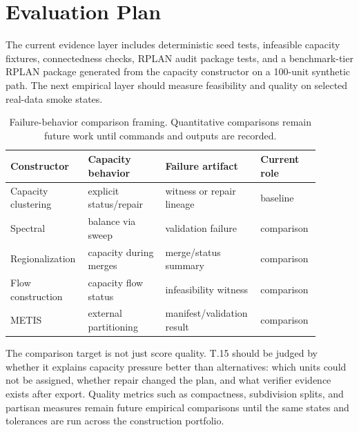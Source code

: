 \section{Evaluation Plan}

The current evidence layer includes deterministic seed tests, infeasible
capacity fixtures, connectedness checks, RPLAN audit package tests, and a
benchmark-tier RPLAN package generated from the capacity constructor on a
100-unit synthetic path. The next empirical layer should measure feasibility
and quality on selected real-data smoke states.

\begin{table}[h]
\centering
\small
{}
\caption{Evidence ladder for T.15 claims. Feasibility and quality are tracked
separately.}
\end{table}

\begin{table}[h]
\centering
\small
\begin{tabular}{p{0.23\linewidth}p{0.24\linewidth}p{0.26\linewidth}p{0.16\linewidth}}
\toprule
Constructor & Capacity behavior & Failure artifact & Current role \\
\midrule
Capacity clustering & explicit status/repair & witness or repair lineage & baseline \\
Spectral & balance via sweep & validation failure & comparison \\
Regionalization & capacity during merges & merge/status summary & comparison \\
Flow construction & capacity flow status & infeasibility witness & comparison \\
METIS & external partitioning & manifest/validation result & comparison \\
\bottomrule
\end{tabular}
\caption{Failure-behavior comparison framing. Quantitative comparisons remain
future work until commands and outputs are recorded.}
\end{table}

The comparison target is not just score quality. T.15 should be judged by
whether it explains capacity pressure better than alternatives: which units
could not be assigned, whether repair changed the plan, and what verifier
evidence exists after export. Quality metrics such as compactness, subdivision
splits, and partisan measures remain future empirical comparisons until the
same states and tolerances are run across the construction portfolio.
